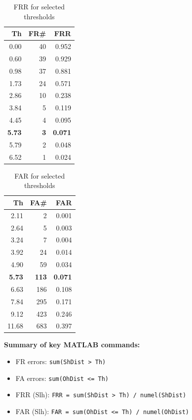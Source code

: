 \documentclass[a4paper,11pt]{article}
\begin{document}
\begin{multicols}{2}
\begin{table}[H]
\centering
\caption{FRR for selected thresholds}
\begin{tabular}{@{}rrr@{}}
\toprule
Th & FR\# & FRR \\
\midrule
0.00 & 40 & 0.952 \\
0.60 & 39 & 0.929 \\
0.98 & 37 & 0.881 \\
1.73 & 24 & 0.571 \\
2.86 & 10 & 0.238 \\
3.84 & 5  & 0.119 \\
4.45 & 4  & 0.095 \\
\textbf{5.73} & \textbf{3}  & \textbf{0.071} \\
5.79 & 2  & 0.048 \\
6.52 & 1  & 0.024 \\
\bottomrule
\end{tabular}
\end{table}

\columnbreak

\begin{table}[H]
\centering
\caption{FAR for selected thresholds}
\begin{tabular}{@{}rrr@{}}
\toprule
Th & FA\# & FAR \\
\midrule
2.11 & 2   & 0.001 \\
2.64 & 5   & 0.003 \\
3.24 & 7   & 0.004 \\
3.92 & 24  & 0.014 \\
4.90 & 59  & 0.034 \\
\textbf{5.73} & \textbf{113} & \textbf{0.071} \\
6.63 & 186 & 0.108 \\
7.84 & 295 & 0.171 \\
9.12 & 423 & 0.246 \\
11.68 & 683 & 0.397 \\
\bottomrule
\end{tabular}
\end{table}
\end{multicols}

\noindent\textbf{Summary of key MATLAB commands:}
\begin{itemize}
    \item FR errors: \texttt{sum(ShDist > Th)}
    \item FA errors: \texttt{sum(OhDist <= Th)}
    \item FRR (Slh): \texttt{FRR = sum(ShDist > Th) / numel(ShDist)}
    \item FAR (Slh): \texttt{FAR = sum(OhDist <= Th) / numel(OhDist)}
\end{itemize}
\end{document}
